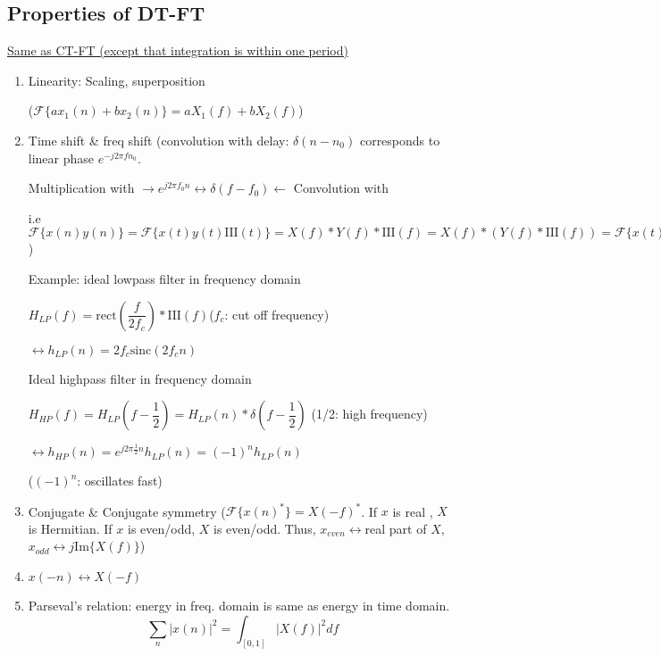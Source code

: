 \documentclass{article}
\begin{document}
    \subsection{Properties of DT-FT}
    \qquad\:\:\underline{Same as CT-FT (except that integration is within one period)}
    \begin{enumerate}
    
        \item Linearity: Scaling, superposition
        
        ($\mathcal{F}\{ax_1(n)+bx_2(n)\}=aX_1(f)+bX_2(f)$)
        \item Time shift \& freq shift (convolution with delay: $\delta(n-n_0)$ corresponds to linear phase $e^{-j2\pi f n_0}$. 
        
        Multiplication with $\rightarrow e^{j2\pi f_0 n}\leftrightarrow \delta(f-f_0)\leftarrow$ Convolution with
    
        i.e $\mathcal{F}\{x(n)y(n)\}=\mathcal{F}\{x(t)y(t)\mathrm{III}(t)\}=X(f)*Y(f)*\mathrm{III}(f)=X(f)*(Y(f)*\mathrm{III}(f))=\mathcal{F}\{x(t)\}*\mathcal{F}\{y(n)\}$)
        
        Example: ideal lowpass filter in frequency domain
        
        $H_{LP}(f)=\mathrm{rect}\left(\dfrac{f}{2f_c}\right)*\mathrm{III}(f)$($f_c$: cut off frequency)
        
        $\leftrightarrow h_{LP}(n)=2f_c\mathrm{sinc}(2f_c n)$
        
        Ideal highpass filter in frequency domain
        
        $H_{HP}(f)=H_{LP}\left(f-\dfrac{1}{2}\right)=H_{LP}(n)*\delta\left(f-\dfrac{1}{2}\right)$
        (1/2: high frequency)
        
        $\leftrightarrow h_{HP}(n)=e^{j2\pi \frac{1}{2}n}h_{LP}(n)=(-1)^n h_{LP}(n)$
        
        ($(-1)^n$: oscillates fast)
        \item Conjugate \& Conjugate symmetry ($\mathcal{F}\{x(n)^*\}=X(-f)^*$. If $x$ is real , $X$ is Hermitian. If $x$ is even/odd, $X$ is even/odd. Thus, $x_{even}\leftrightarrow $real part of $X$, $x_{odd}\leftrightarrow$$j\mathrm{Im}\{X(f)\}$)
        
        \item $x(-n)\leftrightarrow X(-f)$
        
        \item Parseval's relation: energy in freq. domain is same as energy in time domain.
        \[\sum_n{|x(n)|^2}=\int_{[0,1]}|X(f)|^2 df\]
        

\end{enumerate}
\end{document}
